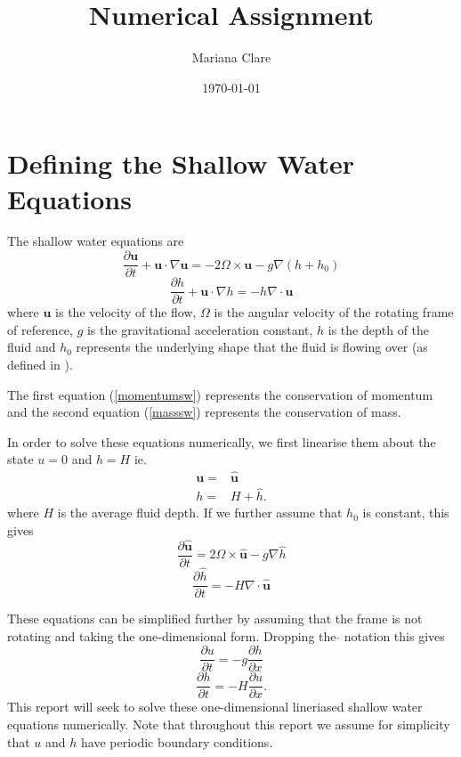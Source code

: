 \documentclass[a4paper,12pt, notitlepage]{article}
\title{Numerical Assignment}
\author{Mariana Clare}
\date{\today}
\begin{document}
	
\maketitle
\thispagestyle{empty}
\section{Defining the Shallow Water Equations}
The shallow water equations are
\begin{equation}\label{momentumsw}
\frac{\partial \mathbf{u}}{\partial t} + \mathbf{u}\cdot\nabla\mathbf{u} = - 2\Omega \times\mathbf{u} - g\nabla (h + h_{0})
\end{equation}
\begin{equation}\label{masssw}
\frac{\partial h}{\partial t} + \mathbf{u}\cdot\nabla h = - h \nabla \cdot \mathbf{u}
\end{equation}
where $\mathbf{u}$ is the velocity of the flow, $\Omega$ is the angular velocity of the rotating frame of reference, $g$ is the gravitational acceleration constant, $h$ is the depth of the fluid and $h_{0}$ represents the underlying shape that the fluid is flowing over (as defined in \cite{MPE textbook}).

The first equation (\ref{momentumsw}) represents the conservation of momentum and the second equation (\ref{masssw}) represents the conservation of mass.

In order to solve these equations numerically, we first linearise them about the state $u = 0$ and $h = H$ ie.
\begin{eqnarray}\nonumber
\mathbf{u} =  & \mathbf{\hat{u}}
 \\   \nonumber
h = &  H + \hat{h} .
\end{eqnarray}
where $H$ is the average fluid depth. If we further assume that $h_{0}$ is constant, this gives
\begin{equation}
\frac{\partial \mathbf{\hat{u}}}{\partial t} = 2 \Omega \times \mathbf{\hat{u}} - g \nabla \hat{h}
\end{equation}
\begin{equation}
\frac{\partial \hat{h}}{\partial t} = - H \nabla \cdot \mathbf{\hat{u}}
\end{equation}

These equations can be simplified further by assuming that the frame is not rotating and taking the one-dimensional form. Dropping the $\hat{}$ notation this gives
\begin{equation}\label{linearisedsw1}
\frac{\partial u}{\partial t} = - g \frac{\partial h}{\partial x}
\end{equation}
\begin{equation}\label{linearisedsw2}
\frac{\partial h}{\partial t} = - H \frac{\partial u}{\partial x}.
\end{equation}
This report will seek to solve these one-dimensional lineriased shallow water equations numerically. Note that throughout this report we assume for simplicity that $u$ and $h$ have periodic boundary conditions.
\end{document}
